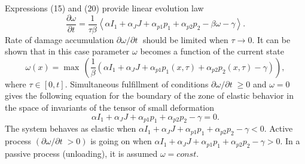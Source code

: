 \documentclass[article,authoryear,jpm]{beg_39}             %
\begin{document}
Expressions (15) and (20) provide linear evolution law
\begin{equation}
\frac{\partial \omega }{\partial t}=\frac{1}{\tau \beta }\left\langle \alpha {{I}_{1}}+{{\alpha }_{J}}J+{{\alpha }_{p1}}{{p}_{1}}+{{\alpha }_{p2}}{{p}_{2}}-\beta \omega -\gamma \right\rangle.
\end{equation}
Rate of damage accumulation ${\partial \omega }/{\partial t}\;$ should be limited when $\tau \to 0$.
It can be shown that in this case parameter $\omega$ becomes a function of the current state
\begin{equation}
\omega(x) ={\mathop{\max}}\,\left( \frac{1}{\beta }\left( \alpha {{I}_{1}}+{{\alpha }_{J}}J+{{\alpha}_{p1}}{{p}_{1}(x,\tau)}+{{\alpha}_{p2}}{{p}_{2}(x,\tau)}-\gamma  \right) \right),
\end{equation}
where $\tau \in [0,t]$.
Simultaneous fulfillment of conditions ${\partial \omega }/{\partial t}\;\ge 0$ and $\omega =0$ gives the following equation for the boundary of the zone of elastic behavior in the space of invariants of the tensor of small deformation
\begin{equation}
\alpha {{I}_{1}}+{{\alpha }_{J}}J+{{\alpha }_{p1}}{{p}_{1}}+{{\alpha }_{p2}}{{p}_{2}}-\gamma =0.
\end{equation}
The system behaves as elastic when $\alpha {{I}_{1}}+{{\alpha }_{J}}J+{{\alpha }_{p1}}{{p}_{1}}+{{\alpha }_{p2}}{{p}_{2}}-\gamma <0$. Active process $({\partial \omega }/{\partial t}\;>0)$ is going on when $\alpha {{I}_{1}}+{{\alpha }_{J}}J+{{\alpha }_{p1}}{{p}_{1}}+{{\alpha }_{p2}}{{p}_{2}}-\gamma >0$. In a passive process (unloading), it is assumed $\omega =const$.
\end{document}
